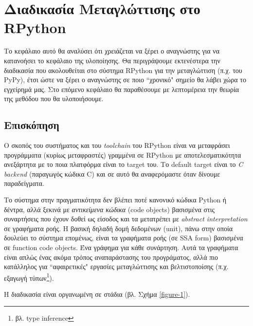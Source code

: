 
\chapter{Διαδικασία Μεταγλώττισης στο RPython}
\label{chapter3a} 

Το κεφάλαιο αυτό θα αναλύσει ότι χρειάζεται να ξέρει ο αναγνώστης για να
κατανοήσει το κεφάλαιο της υλοποίησης. Θα περιγράψουμε εκτενέστερα την
διαδικασία που ακολουθείται στο σύστημα RPython για την μεταγλώττιση (π.χ. του
PyPy), έτσι ώστε να ξέρει ο αναγνώστης σε ποιο ``χρονικό" σημείο θα λάβει χώρα
το εγχείρημά μας. Στο επόμενο κεφάλαιο θα παραθέσουμε με λεπτομέρεια την
θεωρία της μεθόδου που θα υλοποιήσουμε.

\section{Επισκόπηση}

Ο σκοπός του συστήματος και του \textit{toolchain} του RPython είναι να
μεταφράσει προγράμματα (κυρίως μεταφραστές) γραμμένα σε RPython με
αποτελεσματικότητα ανεξάρτητα με το ποια πλατφόρμα είναι το target του. Το
default target είναι το \textit{C backend} (παραγωγός κώδικα C) και σε αυτό θα
αναφερόμαστε όταν δίνουμε παραδείγματα.

Το σύστημα στην πραγματικότητα δεν βλέπει ποτέ κανονικό κώδικα Python ή
δέντρα, αλλά ξεκινά με \textit{αντικείμενα κώδικα} (code objects) βασισμένα
στις συναρτήσεις που έχουν δοθεί ως είσοδος και τα μετατρέπει με
\textit{abstract interpretation}\cite{CousotCousot77}\cite{debray1995abstract}
σε γραφήματα ροής. Η βασική δηλαδή δομή δεδομένων (unit), πάνω στην οποία
δουλεύει το σύστημα επομένως, είναι τα γραφήματα ροής (σε SSA\cite{ssa} form)
βασισμένα σε function code objects. Ένα γράφημα για κάθε συνάρτηση. Αυτά τα
γραφήματα είναι απλώς ένας ακόμα τρόπος αναπαράστασης του προγράματος, αλλά
πιο κατάλληλος για ``αφαιρετικές" εργασίες μεταγλώττισης και βελτιστοποίσης
(π.χ. εξαγωγή τύπων\footnote{βλ. type inference}).

Η διαδικασία είναι οργανωμένη σε στάδια (βλ. Σχήμα \ref{figure-1}).

